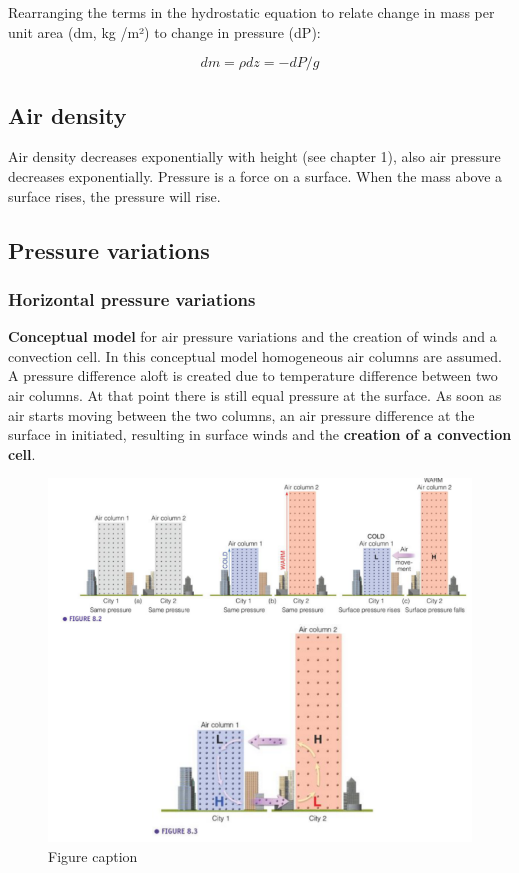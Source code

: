 \documentclass[12pt,oneside]{book}
\begin{document}
Rearranging the terms in the hydrostatic equation to relate change in
mass per unit area (dm, kg /m²) to change in pressure (dP):

\begin{equation} 
  dm = \rho dz = - dP / g
   \label{eq:Eqhydrostatic4}
\end{equation}

\subsection{Air density}\label{air-density}

Air density decreases exponentially with height (see chapter 1), also
air pressure decreases exponentially. Pressure is a force on a surface.
When the mass above a surface rises, the pressure will rise.

\subsection{Pressure variations}\label{pressure-variations}

\subsubsection{Horizontal pressure
variations}\label{horizontal-pressure-variations}

\textbf{Conceptual model} for air pressure variations and the creation
of winds and a convection cell. In this conceptual model homogeneous air
columns are assumed. A pressure difference aloft is created due to
temperature difference between two air columns. At that point there is
still equal pressure at the surface. As soon as air starts moving
between the two columns, an air pressure difference at the surface in
initiated, resulting in surface winds and the \textbf{creation of a
convection cell}.

\begin{figure}
\includegraphics[width=0.8\linewidth]{figures/Figure41andb} \caption{Figure caption}\label{fig:airpressure}
\end{figure}
\end{document}
